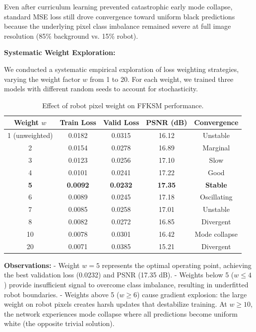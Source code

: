 \documentclass[12pt,a4paper,oneside]{report}
\begin{document}
Even after curriculum learning prevented catastrophic early mode collapse, standard MSE loss still drove convergence toward uniform black predictions because the underlying pixel class imbalance remained severe at full image resolution (85\% background vs. 15\% robot).

\textbf{Systematic Weight Exploration:}

We conducted a systematic empirical exploration of loss weighting strategies, varying the weight factor $w$ from 1 to 20. For each weight, we trained three models with different random seeds to account for stochasticity.

\begin{table}[H]
\centering
\caption{Effect of robot pixel weight on FFKSM performance.}
\label{tab:weight_tuning}
\begin{tabular}{ccccc}
\toprule
Weight $w$ & Train Loss & Valid Loss & PSNR (dB) & Convergence \\
\midrule
1 (unweighted) & 0.0182 & 0.0315 & 16.12 & Unstable \\
2 & 0.0154 & 0.0278 & 16.89 & Marginal \\
3 & 0.0123 & 0.0256 & 17.10 & Slow \\
4 & 0.0101 & 0.0241 & 17.22 & Good \\
\textbf{5} & \textbf{0.0092} & \textbf{0.0232} & \textbf{17.35} & \textbf{Stable} \\
6 & 0.0089 & 0.0245 & 17.18 & Oscillating \\
7 & 0.0085 & 0.0258 & 17.01 & Unstable \\
8 & 0.0082 & 0.0272 & 16.85 & Divergent \\
10 & 0.0078 & 0.0301 & 16.42 & Mode collapse \\
20 & 0.0071 & 0.0385 & 15.21 & Divergent \\
\bottomrule
\end{tabular}
\end{table}

\textbf{Observations:}
- Weight $w = 5$ represents the optimal operating point, achieving the best validation loss (0.0232) and PSNR (17.35 dB).
- Weights below 5 ($w \leq 4$) provide insufficient signal to overcome class imbalance, resulting in underfitted robot boundaries.
- Weights above 5 ($w \geq 6$) cause gradient explosion: the large weight on robot pixels creates harsh updates that destabilize training. At $w \geq 10$, the network experiences mode collapse where all predictions become uniform white (the opposite trivial solution).
\end{document}
